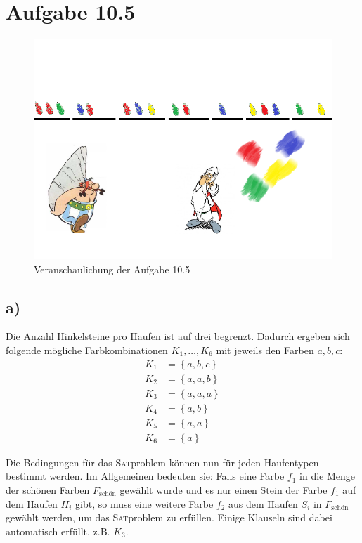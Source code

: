 \documentclass{article}
\begin{document}
\section*{Aufgabe 10.5}
\begin{figure}
  \includegraphics[width=\columnwidth]{hinkelsteine.png}
  \caption{Veranschaulichung der Aufgabe 10.5}
  \label{fig:obelix}
\end{figure}

\subsection*{a)}
Die Anzahl Hinkelsteine pro Haufen ist auf drei begrenzt. Dadurch ergeben sich folgende mögliche Farbkombinationen $K_1,\dots,K_6$ mit jeweils den Farben $a, b, c$:
\begin{align*}
K_1 &= \left\{ a, b, c \right\} \\
K_2 &= \left\{ a, a, b \right\} \\
K_3 &= \left\{ a, a, a \right\} \\
K_4 &= \left\{ a, b \right\} \\
K_5 &= \left\{ a, a \right\} \\
K_6 &= \left\{ a \right\} 
\end{align*}

Die Bedingungen für das \textsc{Sat}problem können nun für jeden Haufentypen bestimmt werden. Im Allgemeinen bedeuten sie: Falls eine Farbe $f_1$ in die Menge der schönen Farben $F_{\text{schön}}$ gewählt wurde und es nur einen Stein der Farbe $f_1$ auf dem Haufen $H_i$ gibt, so muss eine weitere Farbe $f_2$ aus dem Haufen $S_i$ in $F_{\text{schön}}$ gewählt werden, um das \textsc{Sat}problem zu erfüllen. Einige Klauseln sind dabei automatisch erfüllt, z.B. $K_3$.
\end{document}
